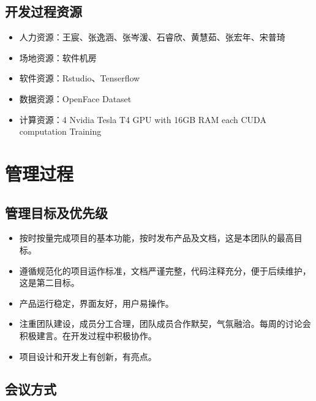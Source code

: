 \documentclass[
  hyperref, a4paper]{ctexart}
\providecommand{\tightlist}{%
  \setlength{\itemsep}{0pt}\setlength{\parskip}{0pt}}
\begin{document}
\hypertarget{ux5f00ux53d1ux8fc7ux7a0bux8d44ux6e90}{%
\subsection{开发过程资源}\label{ux5f00ux53d1ux8fc7ux7a0bux8d44ux6e90}}

\begin{itemize}
\tightlist
\item
  人力资源：王宸、张逸涵、张岑湲、石睿欣、黄慧茹、张宏年、宋普琦
\item
  场地资源：软件机房
\item
  软件资源：Rstudio、Tenserflow
\item
  数据资源：OpenFace Dataset
\item
  计算资源：4 Nvidia Tesla T4 GPU with 16GB RAM each CUDA computation
  Training
\end{itemize}

\hypertarget{ux7ba1ux7406ux8fc7ux7a0b}{%
\section{管理过程}\label{ux7ba1ux7406ux8fc7ux7a0b}}

\hypertarget{ux7ba1ux7406ux76eeux6807ux53caux4f18ux5148ux7ea7}{%
\subsection{管理目标及优先级}\label{ux7ba1ux7406ux76eeux6807ux53caux4f18ux5148ux7ea7}}

\begin{itemize}
\tightlist
\item
  按时按量完成项目的基本功能，按时发布产品及文档，这是本团队的最高目标。
\item
  遵循规范化的项目运作标准，文档严谨完整，代码注释充分，便于后续维护，这是第二目标。
\item
  产品运行稳定，界面友好，用户易操作。
\item
  注重团队建设，成员分工合理，团队成员合作默契，气氛融洽。每周的讨论会积极建言。在开发过程中积极协作。
\item
  项目设计和开发上有创新，有亮点。
\end{itemize}

\hypertarget{ux4f1aux8baeux65b9ux5f0f}{%
\subsection{会议方式}\label{ux4f1aux8baeux65b9ux5f0f}}
\end{document}
